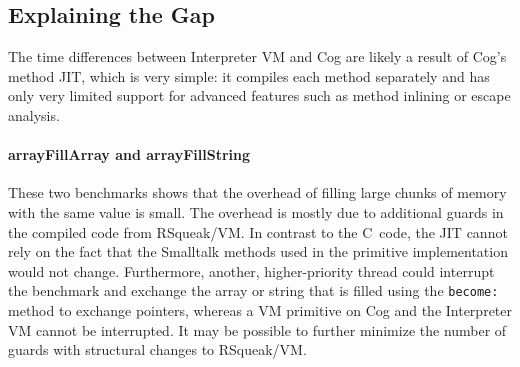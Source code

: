 \documentclass[
10pt,          %
]{sigplanconf}
\begin{document}





\subsection{Explaining the Gap}

The time differences between Interpreter \ac{VM} and Cog are likely a
result of Cog's method \ac{JIT}, which is very simple: it compiles
each method separately and has only very limited support for advanced
features such as method inlining or escape analysis.

\paragraph{arrayFillArray and arrayFillString}
These two benchmarks shows that the overhead of filling large chunks of memory
with the same value is small. The overhead is mostly due to additional guards
in the compiled code from RSqueak/VM. In contrast to the C~code, the \ac{JIT}
cannot rely on the fact that the Smalltalk methods used in the primitive
implementation would not change. Furthermore, another, higher-priority thread
could interrupt the benchmark and exchange the array or string that is filled
using the \verb!become:! method to exchange pointers, whereas a \ac{VM}
primitive on Cog and the Interpreter \ac{VM} cannot be interrupted. It may be
possible to further minimize the number of guards with structural changes to
RSqueak/VM.
\end{document}
